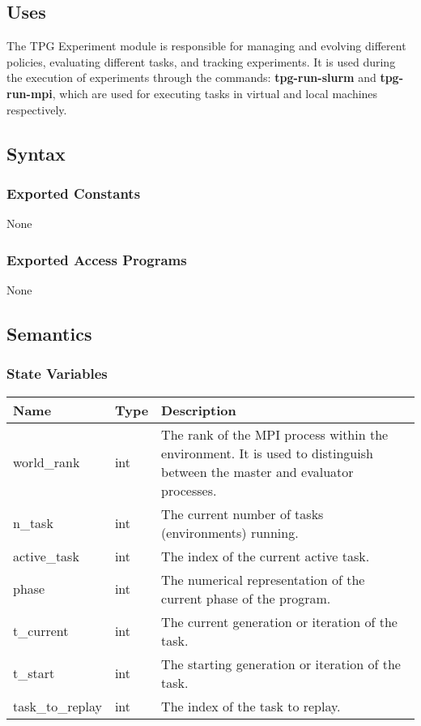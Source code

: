 \documentclass[12pt, titlepage]{article}
\begin{document}
\subsection{Uses}
The TPG Experiment module is responsible for managing and evolving different policies, evaluating different tasks, and tracking experiments. It is used during the execution of experiments through the commands: \textbf{tpg-run-slurm} and \textbf{tpg-run-mpi}, which are used for executing tasks in virtual and local machines respectively.
\subsection{Syntax}

\subsubsection{Exported Constants}
None

\subsubsection{Exported Access Programs}
None

\subsection{Semantics}

\subsubsection{State Variables}
\begin{center}
  \begin{tabular}{p{4cm} p{3cm} p{7cm}}
  \hline
  \textbf{Name} & \textbf{Type} & \textbf{Description} \\
  \hline
  world\_rank & int & The rank of the MPI process within the environment. It is used to distinguish between the master and evaluator processes. \\
  \hline
  n\_task & int & The current number of tasks (environments) running. \\
  \hline
  active\_task & int & The index of the current active task. \\
  \hline
  phase & int & The numerical representation of the current phase of the program. \\
  \hline
  t\_current & int & The current generation or iteration of the task. \\
  \hline
  t\_start & int & The starting generation or iteration of the task. \\
  \hline
  task\_to\_replay & int & The index of the task to replay. \\
  \hline
  \end{tabular}
\end{center}
\end{document}
